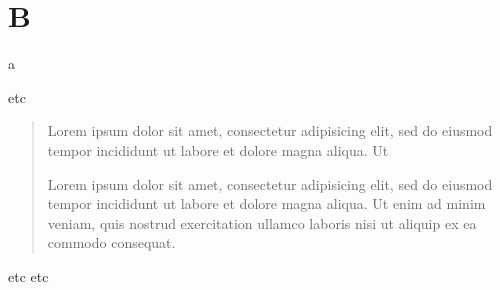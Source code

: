 \documentclass{article}
\begin{document}
\section{B}
a

  \beginnumbering
	
    \pstart
    etc
    
     \begin{quote} 
    Lorem ipsum dolor sit amet, consectetur adipisicing elit, sed do eiusmod tempor incididunt ut labore et dolore magna aliqua. Ut 
    
  Lorem ipsum dolor sit amet, consectetur adipisicing elit, sed do eiusmod tempor incididunt ut labore et dolore magna aliqua. Ut enim ad minim veniam, quis nostrud exercitation ullamco laboris nisi ut aliquip ex ea commodo consequat. 
    \end{quote}
   
   
   etc etc
   \pend
   \endnumbering
    
\end{document}
